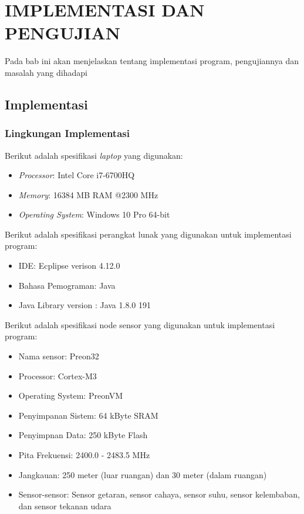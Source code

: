 \chapter{IMPLEMENTASI DAN PENGUJIAN}

Pada bab ini akan menjelaskan tentang implementasi program, pengujiannya dan masalah yang dihadapi

\section{Implementasi}
\subsection{Lingkungan Implementasi}
Berikut adalah spesifikasi \textit{laptop} yang digunakan:
\begin{itemize}
    \item \textit{Processor}: Intel Core i7-6700HQ
    \item \textit{Memory}: 16384 MB RAM @2300 MHz
    \item \textit{Operating System}: Windows 10 Pro 64-bit
\end{itemize}


Berikut adalah spesifikasi perangkat lunak yang digunakan untuk implementasi program:
\begin{itemize}
    \item IDE: Ecplipse verison 4.12.0
    \item Bahasa Pemograman: Java
    \item Java Library version : Java 1.8.0 191
\end{itemize}

Berikut adalah spesifikasi node sensor yang digunakan untuk implementasi program:
\begin{itemize}
    \item Nama sensor: Preon32
    \item Processor: Cortex-M3
    \item Operating System: PreonVM
    \item Penyimpanan Sistem: 64 kByte SRAM
    \item Penyimpnan Data: 250 kByte Flash
    \item Pita Frekuensi: 2400.0 - 2483.5 MHz
    \item Jangkauan: 250 meter (luar ruangan) dan 30 meter (dalam ruangan)
    \item Sensor-sensor: Sensor getaran, sensor cahaya, sensor suhu, sensor kelembaban, dan sensor tekanan udara
\end{itemize}

